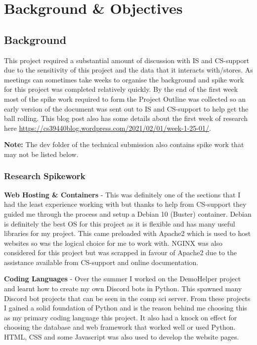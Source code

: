 \chapter{Background \& Objectives} 

\section{Background}

This project required a substantial amount of discussion with IS and CS-support due to the sensitivity of this project and the data that it interacts with/stores. As meetings can sometimes take weeks to organise the background and spike work for this project was completed relatively quickly. By the end of the first week most of the spike work required to form the Project Outline was collected so an early version of the document was sent out to IS and CS-support to help get the ball rolling. This blog post also has some details about the first week of research here \href{https://cs39440blog.wordpress.com/2021/02/01/week-1-25-01/}{https://cs39440blog.wordpress.com/2021/02/01/week-1-25-01/}.

\textbf{Note:} The dev folder of the technical submission also contains spike work that may not be listed below.

\subsection{Research Spikework}\label{sec1:Research}
\textbf{Web Hosting \& Containers} - This was definitely one of the sections that I had the least experience working with but thanks to help from CS-support they guided me through the process and setup a Debian 10 (Buster) \cite{debian} container. Debian is definitely the best OS for this project as it is flexible and has many useful libraries for my project. This came preloaded with Apache2 \cite{apache2} which is used to host websites so was the logical choice for me to work with. NGINX \cite{nginx} was also considered for this project but was scrapped in favour of Apache2 due to the assistance available from CS-support and online documentation. 

\textbf{Coding Languages} -  Over the summer I worked on the DemoHelper \cite{demohelper} project and learnt how to create my own Discord bots in Python. This spawned many Discord bot projects that can be seen in the comp sci server. From these projects I gained a solid foundation of Python and is the reason behind me choosing this as my primary coding language this project. It also had a knock on effect for choosing the database and web framework that worked well or used Python. HTML, CSS and some Javascript was also used to develop the website pages.

